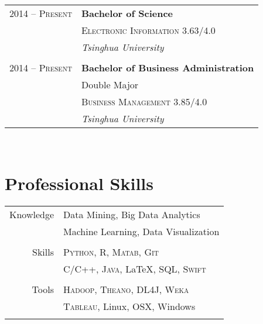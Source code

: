 \documentclass[10pt]{article} %
\begin{document}
{\begin{minipage}[t]{0.44\textwidth}
\begin{tabular}{rl}
2014 -- \textsc{Present} & \textbf{Bachelor of Science} \\ 
& \textsc{Electronic Information 3.63/4.0} \\ 
& \textit{Tsinghua University}\\
&\\
	 

2014 -- \textsc{Present} &  \textbf{Bachelor of Business Administration} \\ 
& \small Double Major \\
& \textsc{Business Management 3.85/4.0} \\ 
& \textit{Tsinghua University}\\



\end{tabular}\\[10pt]


\section{Professional Skills} 


\begin{tabular}{rl}
Knowledge
& Data Mining, Big Data Analytics \\
& Machine Learning, Data Visualization\\
& \\

Skills
& \textsc{Python}, \textsc{R}, \textsc{Matab}, \textsc{Git} \\
& \textsc{C/C++}, \textsc{Java}, \LaTeX, \textsc{SQL},  \textsc{Swift} \\
&\\

Tools
& \textsc{Hadoop}, \textsc{Theano}, \textsc{DL4J}, \textsc{Weka} \\ 
& \textsc{Tableau}, Linux, OSX, Windows \\
&\\

\end{tabular}


\end{minipage}}
\end{document}
